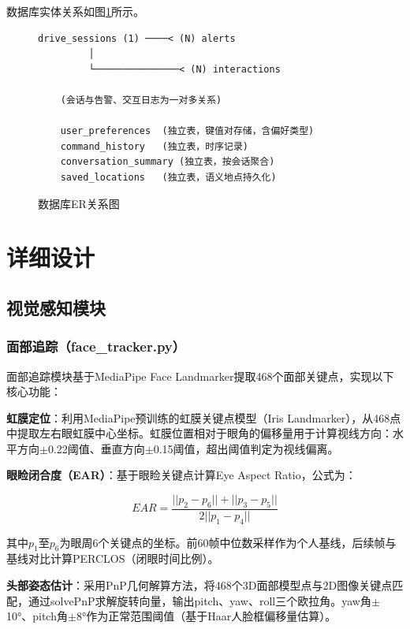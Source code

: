 \documentclass[a4paper]{article}
\begin{document}
数据库实体关系如图\ref{fig:er}所示。

\begin{figure}[H]
    \centering
    \caption{数据库ER关系图}
    \label{fig:er}
    \begin{lstlisting}[frame=single, basicstyle=\small\ttfamily]
    drive_sessions (1) ────< (N) alerts
         │
         └───────────────< (N) interactions

    (会话与告警、交互日志为一对多关系)

    user_preferences  (独立表，键值对存储，含偏好类型)
    command_history   (独立表，时序记录)
    conversation_summary (独立表，按会话聚合)
    saved_locations   (独立表，语义地点持久化)
    \end{lstlisting}
\end{figure}

\section{详细设计}

\subsection{视觉感知模块}

\subsubsection{面部追踪（face\_tracker.py）}

面部追踪模块基于MediaPipe Face Landmarker提取468个面部关键点，实现以下核心功能：

\textbf{虹膜定位}：利用MediaPipe预训练的虹膜关键点模型（Iris Landmarker），从468点中提取左右眼虹膜中心坐标。虹膜位置相对于眼角的偏移量用于计算视线方向：水平方向$\pm$0.22阈值、垂直方向$\pm$0.15阈值，超出阈值判定为视线偏离。

\textbf{眼睑闭合度（EAR）}：基于眼睑关键点计算Eye Aspect Ratio，公式为：

$$EAR = \frac{||p_2 - p_6|| + ||p_3 - p_5||}{2||p_1 - p_4||}$$

其中$p_1$至$p_6$为眼周6个关键点的坐标。前60帧中位数采样作为个人基线，后续帧与基线对比计算PERCLOS（闭眼时间比例）。

\textbf{头部姿态估计}：采用PnP几何解算方法，将468个3D面部模型点与2D图像关键点匹配，通过solvePnP求解旋转向量，输出pitch、yaw、roll三个欧拉角。yaw角$\pm$10°、pitch角$\pm$8°作为正常范围阈值（基于Haar人脸框偏移量估算）。
\end{document}
